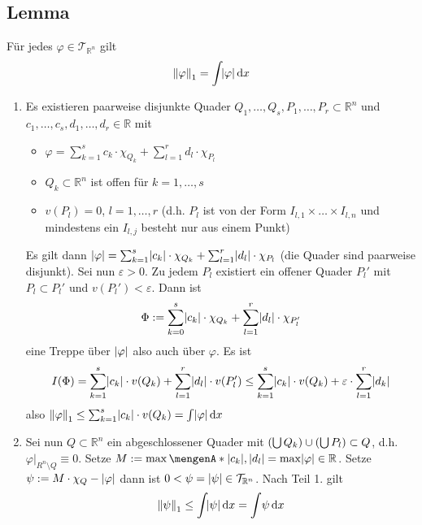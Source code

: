 \subsection[{Lemma: Das Integral einer Treppenfunktion $\varphi$ ist gleich $\norm[1]{\varphi} $}]{Lemma} %
\label{sub:311}
Für jedes $\varphi \in \mathcal{T}_{\mathds{R}^n}$ gilt 
\[
	\norm[1]{\varphi} = \int\! \abs{\varphi}  \, \mathrm{d}x   
\]
\begin{enumerate}[1.]
	\item Es existieren paarweise disjunkte Quader $Q_1, \ldots , Q_s, P_1, \ldots , P_r \subset \mathds{R}^n$ und $c_1, \ldots , c_s, d_1, \ldots , d_r \in \mathds{R}$
	mit 
	\begin{itemize}
		\item $\varphi = \sum_{k=1}^{s} c_k \cdot \chi_{Q_k} + \sum_{l=1}^{r} d_l \cdot \chi_{P_l}$
		\item $Q_k \subset \mathds{R}^n$ ist offen für $k=1, \ldots , s$
		\item $v(P_l) = 0$, $l=1,\ldots ,r$ (d.h. $P_l$ ist von der Form $I_{l,1} \times \ldots \times I_{l,n}$ 
		 und mindestens ein $I_{l,j}$ besteht nur aus einem Punkt)
	\end{itemize}
	Es gilt dann $\lvert\varphi\rvert = \sum_{k=1}^{s} \lvert c_k\rvert \cdot \chi_{Q_k} + \sum_{l=1}^{r} \lvert d_l\rvert \cdot \chi_{P_l}  $ (die Quader sind paarweise disjunkt). Sei nun
	$\varepsilon>0$. Zu jedem $P_l$ existiert ein offener Quader $P_l'$ mit $P_l \subset P_l'$ und $v(P_l') < \varepsilon$. Dann ist 
	\[
		\Phi := \sum_{k=0}^{s} \lvert c_k\rvert \cdot \chi_{Q_k} + \sum_{l=1}^{r} \lvert d_l\rvert \cdot \chi_{P_l'}   
	\]
	eine Treppe über $\lvert\varphi\rvert $ also auch über $\varphi$. Es ist 
	\[
		I(\Phi) = \sum_{k=1}^{s} \lvert c_k\rvert \cdot v(Q_k) + \sum_{l=1}^{r} \lvert d_l\rvert \cdot v(P_l') \le \sum_{k=1}^{s} \lvert c_k\rvert \cdot v(Q_k) + \varepsilon \cdot 
		\sum_{l=1}^{r} \lvert d_k\rvert      
	\]
	also $\norm[1]{\varphi}  \le \sum_{k=1}^{s} \abs{c_k} \cdot v(Q_k) = \int \abs{\varphi}  \, \mathrm{d}x   $
	\item Sei nun $Q \subset \mathds{R}^n$ ein abgeschlossener Quader mit $(\bigcup Q_k) \cup (\bigcup P_l) \subset Q$, d.h. 
	$\varphi\big|_{R^n \setminus Q} \equiv 0$. Setze $M := \max \set{\abs{c_k}, \abs{d_l}  } = \max \abs{\varphi} \in \mathds{R} $. Setze 
	$\psi := M \cdot \chi_Q - \lvert\varphi\rvert$ dann ist $0 <\psi = \lvert\psi\rvert \in \mathcal{T}_{\mathbb{R}^n}$. Nach Teil 1. gilt 
	\[
		\norm[1]{\psi} \le \int\! \abs{\psi}  \, \mathrm{d}x = \int \!\psi  \, \mathrm{d}x   
	\]

\end{enumerate}
